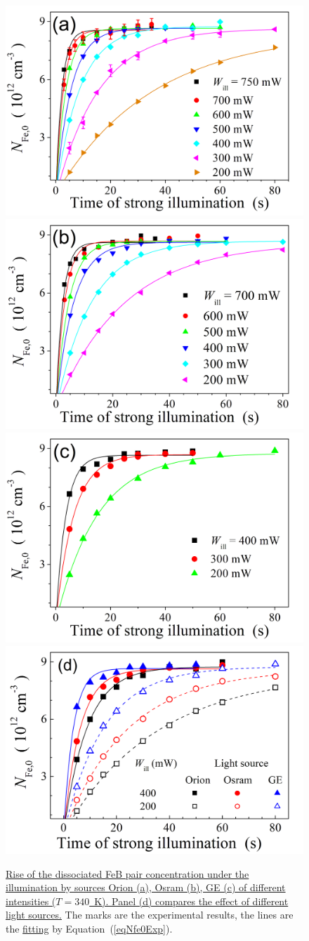 \documentclass{WileyMSP-template}
\begin{document}
\begin{figure}
\centering
  \includegraphics[width=0.4\linewidth]{Fig3a.png}
  \includegraphics[width=0.4\linewidth]{Fig3b.png}
  \includegraphics[width=0.4\linewidth]{Fig3c.png}
  \includegraphics[width=0.4\linewidth]{Fig3d.png}
  \caption{\textcolor[rgb]{0.00,0.07,1.00}{\uline{Rise of the dissociated FeB pair concentration under the illumination by sources Orion (a), Osram (b), GE (c) of different intensities ($T=340$~K).
  Panel (d) compares the effect of different light sources.}}
  The marks are the experimental results, the lines are the \textcolor[rgb]{0.00,0.07,1.00}{\uline{fitting}} by Equation~(\ref{eqNfe0Exp}).
   }
  \label{fig3}
\end{figure}
\end{document}
